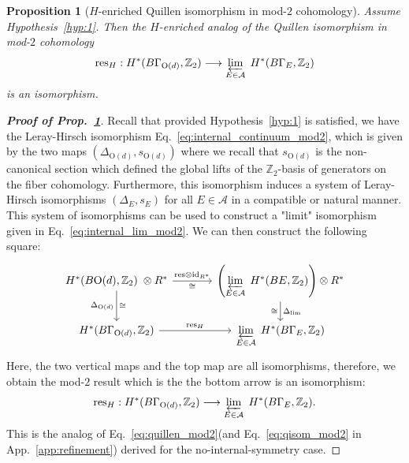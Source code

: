 \documentclass[aps,prx,reprint,superscriptaddress,twocolumn,amsmath,amssymb,amsfonts, nofootinbib]{revtex4-2}
\newcommand{\res}{\text{res}}
\newcommand{\Z}{\mathbb{Z}}
\theoremstyle{apsstyle}
\newtheorem{proposition}[theorem]{Proposition}
\begin{document}
\bigskip 

\begin{proposition}[$H$-enriched Quillen isomorphism in mod-$2$ cohomology]
\label{prop:quillen_isom_H}
    Assume Hypothesis~\ref{hyp:1}. Then the $H$-enriched analog of the Quillen isomorphism in mod-$2$ cohomology
    \begin{equation}
    \label{eq:internal_mod2_isom}
    \res_{H}: H^{*}(B\Gamma_{\mathrm{O}(d)}, \Z_{2}) \longrightarrow \varprojlim\limits_{E\in \mathcal{A}}\; H^{*}(B\Gamma_{E}, \Z_{2})
    \end{equation}
    is an isomorphism.
\end{proposition}

\begin{proof}[\textnormal{\textbf{Proof of Prop.~\ref{prop:quillen_isom_H}}}]  
Recall that provided Hypothesis~\ref{hyp:1} is satisfied, we have the Leray-Hirsch isomorphism Eq.~\ref{eq:internal_continuum_mod2}, which is given by the two maps $(\Delta_{\mathrm{O}(d)}, s_{\mathrm{O}(d)})$ where we recall that $s_{\mathrm{O}(d)}$ is the non-canonical section which defined the global lifts of the $\Z_{2}$-basis of generators on the fiber cohomology. Furthermore, this isomorphism induces a system of Leray-Hirsch isomorphisms $(\Delta_{E},s_{E})$ for all $E\in \mathcal{A}$ in a compatible or natural manner. This system of isomorphisms can be used to construct a "limit" isomorphism given in Eq.~\ref{eq:internal_lim_mod2}. We can then construct the following square:
\begin{equation}
\label{eq:app_diagram}
    \begin{tikzcd}[column sep = large]
        H^{*}(B\mathrm{O}(d), \Z_{2})\;\otimes  R^{*} \arrow[d, "\Delta_{\mathrm{O}(d)}", swap, "\cong"'] \arrow[r, "\res\otimes \mathrm{id}_{R^{*}}", "\cong"'] &  \left( \varprojlim\limits_{E\in \mathcal{A}}\; H^{*}(BE, \Z_{2})\right)\otimes R^{*} \arrow[d, "\Delta_{\lim}", "\cong"']\\
        H^{*}(B\Gamma_{\mathrm{O}(d)}, \Z_{2}) \arrow[r, "\res_{H}"] &\varprojlim\limits_{E\in \mathcal{A}}\; H^{*}(B\Gamma_{E}, \Z_{2})
    \end{tikzcd}
\end{equation}
Here, the two vertical maps and the top map are all isomorphisms, therefore, we obtain the mod-$2$ result which is the the bottom arrow is an isomorphism:
\begin{equation}
    \res_{H}: H^{*}(B\Gamma_{\mathrm{O}(d)}, \Z_{2}) \longrightarrow \varprojlim\limits_{E\in \mathcal{A}}\; H^{*}(B\Gamma_{E}, \Z_{2}).
\end{equation}
This is the analog of Eq.~\ref{eq:quillen_mod2}(and Eq.~\ref{eq:qisom_mod2} in App.~\ref{app:refinement}) derived for the no-internal-symmetry case.
\end{proof}
\end{document}

